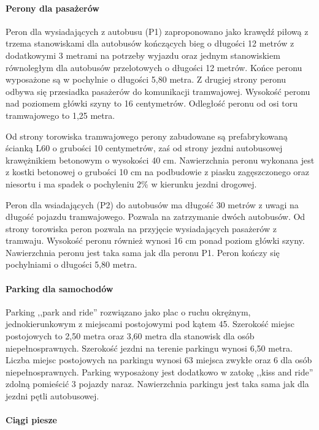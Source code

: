 \documentclass[twoside,12pt]{article}
\begin{document}
	\paragraph{Perony dla pasażerów}\mbox{}
	
	Peron dla wysiadających z autobusu (P1) zaproponowano jako krawędź piłową z trzema stanowiskami dla autobusów kończących bieg o długości 12 metrów z dodatkowymi 3 metrami na potrzeby wyjazdu oraz jednym stanowiskiem równoległym dla autobusów przelotowych o długości 12 metrów. Końce peronu wyposażone są w pochylnie o długości 5,80 metra. Z drugiej strony peronu odbywa się przesiadka pasażerów do komunikacji tramwajowej. Wysokość peronu nad poziomem główki szyny to 16 centymetrów. Odległość peronu od osi toru tramwajowego to 1,25 metra. 
	
	Od strony torowiska tramwajowego perony zabudowane są prefabrykowaną ścianką L60 o grubości 10 centymetrów, zaś od strony jezdni autobusowej krawężnikiem betonowym o wysokości 40 cm. Nawierzchnia peronu wykonana jest z kostki betonowej o grubości 10 cm na podbudowie z piasku zagęszczonego oraz niesortu i ma spadek o pochyleniu 2\% w kierunku jezdni drogowej. 
	
	Peron dla wsiadających (P2) do autobusów ma długość 30 metrów z uwagi na długość pojazdu tramwajowego. Pozwala na zatrzymanie dwóch autobusów. Od strony torowiska peron pozwala na przyjęcie wysiadających pasażerów z tramwaju. Wysokość peronu również wynosi 16 cm ponad poziom główki szyny. Nawierzchnia peronu jest taka sama jak dla peronu P1. Peron kończy się pochylniami o długości 5,80 metra. 
	
	\paragraph{Parking dla samochodów}\mbox{}
	
	Parking ,,park and ride'' rozwiązano jako plac o ruchu okrężnym, jednokierunkowym z miejscami postojowymi pod kątem 45\textdegree. Szerokość miejsc postojowych to 2,50 metra oraz 3,60 metra dla stanowisk dla osób niepełnosprawnych. Szerokość jezdni na terenie parkingu wynosi 6,50 metra. Liczba miejsc postojowych na parkingu wynosi 63 miejsca zwykłe oraz 6 dla osób niepełnosprawnych. Parking wyposażony jest dodatkowo w zatokę ,,kiss and ride'' zdolną pomieścić 3 pojazdy naraz. Nawierzchnia parkingu jest taka sama jak dla jezdni pętli autobusowej. 
	
	\paragraph{Ciągi piesze}\mbox{}
	
\end{document}
